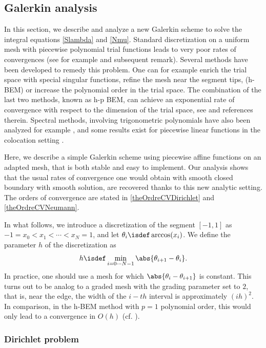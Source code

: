 \documentclass[a4paper]{article}
\begin{document}
\subsection{Galerkin analysis}


In this section, we describe and analyze a new Galerkin scheme to solve the integral equations \eqref{Slambda} and \eqref{Nmu}. Standard discretization on a uniform mesh with piecewise polynomial trial functions leads to very poor rates of convergences (see for example \cite[Chap. 4, ]{sauter2011boundary} and subsequent remark). Several methods have been developed to remedy this problem. One can for example enrich the trial space with special singular functions, refine the mesh near the segment tips, (h-BEM) or increase the polynomial order in the trial space. The combination of the last two methods, known as h-p BEM, can achieve an exponential rate of convergence with respect to the dimension of the trial space, see \cite{postell1990h} and references therein. Spectral methods, involving trigonometric polynomials have also been analyzed for example \cite{bruno2012second}, and some results exist for piecewise linear functions in the colocation setting \cite{costabel1988convergence}. 

Here, we describe a simple Galerkin scheme using piecewise affine functions on an adapted mesh, that is both stable and easy to implement. Our analysis shows that the usual rates of convergence one would obtain with smooth closed boundary with smooth solution, are recovered thanks to this new analytic setting. The orders of convergence are stated in \autoref{theOrdreCVDirichlet} and \autoref{theOrdreCVNeumann}. 

In what follows, we introduce a discretization of the segment $[-1,1]$ as $-1 = x_0 < x_1 < \cdots < x_N = 1$, and let $\theta_i \isdef \arccos(x_i)$. We define the parameter $h$ of the discretization as 
\[ h \isdef \min_{i=0\cdots N-1} \abs{\theta_{i+1} - \theta_{i}}.\]
In practice, one should use a mesh for which $\abs{\theta_i - \theta_{i+1}}$ is constant. This turns out to be analog to a graded mesh with the grading parameter set to $2$, that is, near the edge, the width of the $i-th$ interval is approximately $(ih)^2$. In comparison, in the h-BEM method with $p=1$ polynomial order, this would only lead to a convergence in $O(h)$ (cf. \cite[Theorem 1.3]{postell1990h}).

\subsubsection{Dirichlet problem}
\end{document}
